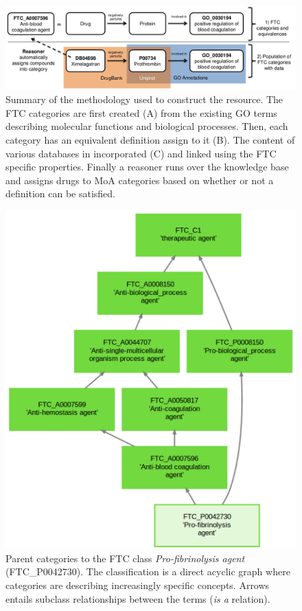 \documentclass{bioinfo}
\begin{document}
\begin{figure}[!tpb]%
\centerline{\includegraphics{fig1.png}}
\caption{Summary of the methodology used to construct the resource. The FTC categories are first created (A) from the existing GO terms
describing molecular functions and biological processes. Then, each category has an equivalent definition assign to it (B).
The content of various databases in incorporated (C) and linked using the FTC specific properties. Finally a reasoner runs over the knowledge
base and assigns drugs to MoA categories based on whether or not a definition can be satisfied.}\label{fig:01}
\end{figure}

\begin{figure}[!tpb]%
\centerline{\includegraphics{fig2.png}}
\caption{Parent categories to the FTC class \emph{Pro-fibrinolysis agent} (FTC\_P0042730). The classification is a direct 
acyclic graph where categories are describing increasingly specific concepts. Arrows entails subclass relationships 
between the terms (\emph{is a} relation).}\label{fig:02}
\end{figure}
\end{document}
